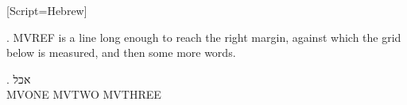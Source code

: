 
\newfontfamily{}[Script=Hebrew]


\ex. MVREF is a line long enough to reach the right margin, against which
the grid below is measured, and then some more words.

\GlossRTL
\ex. \gll {} אכל  \\ MVONE MVTWO MVTHREE \\


